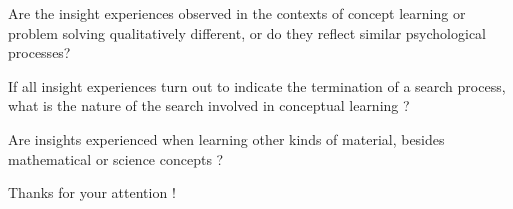 \documentclass[11pt]{beamer}
\begin{document}
                    \begin{frame}

                      Are the insight experiences observed in the contexts of concept learning or problem solving qualitatively different, or do they reflect similar psychological processes?

                      If all insight experiences turn out to indicate the termination of a search process, what is the nature of the search involved in conceptual learning ?

                      Are insights experienced when learning other kinds of material, besides mathematical or science concepts ?

                      \end{frame}

                    {
                      \begin{frame}

                        \centering

                        Thanks for your attention !


                      \end{frame}
                    }
                    
\end{document}
